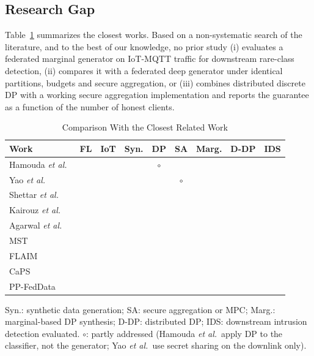 \documentclass[conference]{IEEEtran}
\newcommand{\yes}{\ding{51}}
\newcommand{\no}{\ding{55}}
\newcommand{\partly}{$\circ$}
\begin{document}
\subsection{Research Gap}
Table~\ref{tab:lit_review} summarizes the closest works. Based on a non-systematic search of the literature, and to the best of our knowledge, no prior study (i) evaluates a federated marginal generator on IoT-MQTT traffic for downstream rare-class detection, (ii) compares it with a federated deep generator under identical partitions, budgets and secure aggregation, or (iii) combines distributed discrete DP with a working secure aggregation implementation and reports the guarantee as a function of the number of honest clients.

\begin{table}[!t]
\centering
\caption{Comparison With the Closest Related Work}
\label{tab:lit_review}
\scriptsize
\setlength{\tabcolsep}{3.2pt}
\begin{tabular}{l c c c c c c c c}
\toprule
\textbf{Work} & \textbf{FL} & \textbf{IoT} & \textbf{Syn.} & \textbf{DP} & \textbf{SA} & \textbf{Marg.} & \textbf{D-DP} & \textbf{IDS} \\
\midrule
Hamouda \textit{et al.}~\cite{hamouda2024}  & \yes & \yes & \yes & \partly & \no  & \no  & \no  & \yes \\
Yao \textit{et al.}~\cite{yao2024}          & \yes & \yes & \yes & \yes & \partly & \no  & \no  & \yes \\
Shettar \textit{et al.}~\cite{shettar2026}  & \yes & \yes & \yes & \yes & \no  & \no  & \no  & \yes \\
Kairouz \textit{et al.}~\cite{kairouz2021}  & \yes & \no  & \no  & \yes & \yes & \no  & \yes & \no  \\
Agarwal \textit{et al.}~\cite{agarwal2021}  & \yes & \no  & \no  & \yes & \yes & \no  & \yes & \no  \\
MST~\cite{mckenna2021mst}          & \no  & \no  & \yes & \yes & \no  & \yes & \no  & \no  \\
FLAIM~\cite{maddock2024}           & \yes & \no  & \yes & \yes & \yes & \yes & \no  & \no  \\
CaPS~\cite{pentyala2024}           & \no  & \no  & \yes & \yes & \yes & \yes & \no  & \no  \\
\rowcolor{gray!15}
PP-FedData                         & \yes & \yes & \yes & \yes & \yes & \yes & \yes & \yes \\
\bottomrule
\end{tabular}

\vspace{2pt}
\parbox{\columnwidth}{\scriptsize Syn.: synthetic data generation; SA: secure aggregation or MPC; Marg.: marginal-based DP synthesis; D-DP: distributed DP; IDS: downstream intrusion detection evaluated. \partly: partly addressed (Hamouda \textit{et al.}\ apply DP to the classifier, not the generator; Yao \textit{et al.}\ use secret sharing on the downlink only).}
\end{table}
\end{document}
